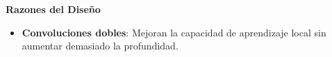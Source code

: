 \begin{enumerate}
\begin{itemize}
  
  
  
  
  
  
  
  
  

\textbf{Razones del Diseño}
\begin{itemize}
    \item \textbf{Convoluciones dobles}: Mejoran la capacidad de aprendizaje local sin aumentar demasiado la profundidad.
  

\end{itemize}
\end{itemize}
\end{enumerate}
